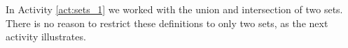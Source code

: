\begin{comment}
	\begin{enumerate}[i.]
	\item The Venn diagrams and (a) indicate that $(A \cup B)^c = A^c \cap B^c$. To prove this statement, start by letting $x \in (A \cup B)^c$. Then $x \notin (A \cup B)$. So $x \notin A$ and $x \notin B$. This means that $x \in A^c$ and $x \in B^c$, which implies that $x \in (A^c \cap B^c)$. We conclude that $(A \cup B)^c \subseteq (A^c \cap B^c)$.
	
Now suppose that $x \in (A^c \cap B^c)$. Then $x \in A^c$ and $x \in B^c$. So $x \notin A$ and $x \notin B$ and $x \notin (A \cup B)$. From this it follows that $x \in (A \cup B)^c$. We conclude that $(A^c \cap B^c) \subseteq (A \cup B)^c$.The two containments demonstrate that $(A \cup B)^c = A^c \cap B^c$.

	\item The Venn diagrams and (a) indicate that $(A \cap B)^c = A^c \cup B^c$.  prove this statement, start by letting $x \in (A \cap B)^c$. Then $x \notin (A \cap B)$. So $x \notin A$ or $x \notin B$. This means that $x \in A^c$ or $x \in B^c$, which implies that $x \in (A^c \cup B^c)$. We conclude that $(A \cap B)^c \subseteq (A^c \cup B^c)$.
	
Now suppose that $x \in (A^c \cup B^c)$. Then $x \in A^c$ or $x \in B^c$. So $x \notin A$ or $x \notin B$, which means $x \notin (A \cap B)$. But this implies that $x \in (A \cap B)^c$. We conclude that $(A^c \cup B^c) \subseteq (A \cap B)^c$.The two containments demonstrate that $(A \cap B)^c = A^c \cup B^c$.

	\end{enumerate}
	
\ea	

\end{comment}

In Activity \ref{act:sets_1} we worked with the union and intersection of two sets. There is no reason to restrict these definitions to only two sets, as the next activity illustrates. 

